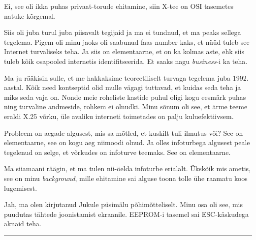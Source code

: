 Ei, see oli ikka puhas privaat-torude ehitamine, siin X-tee on OSI tasemetes 
natuke kõrgemal.


Siis oli juba turul juba piisavalt tegijaid ja ma ei tundnud, et ma peaks 
sellega tegelema. Pigem oli minu jaoks oli saabunud faas number kaks, et nüüd 
tuleb see Internet turvaliseks teha. Ja siis on elementaarne, et on ka kolmas 
aste, ehk siis tuleb kõik osapooled internetis identifitseerida. Et saaks nagu 
\emph{business}-i ka teha. 


Ma ju rääkisin sulle, et me hakkaksime teoreetiliselt turvaga tegelema juba 
1992. aastal. Kõik need kontseptid olid mulle vägagi tuttavad, et kuidas seda  
teha ja miks seda vaja on. Nonde meie roheliste kastide puhul oligi kogu 
eesmärk puhas ning turvaline andmeside, rohkem ei olnudki. Minu  sõnum oli see, 
et ärme teeme eraldi X.25 võrku, üle avaliku interneti toimetades on palju 
kuluefektiivsem.


Probleem on aegade algusest, mis sa mõtled, et kuskilt tuli ilmutus või? See on 
elementaarne, see on kogu aeg niimoodi olnud. Ja olles  infoturbega algusest 
peale tegelenud on selge, et  võrkudes on infoturve  teemaks. See on 
elementaarne. 


Ma siiamaani räägin, et ma tulen nii-öelda infoturbe erialalt. Ükskõik mis 
ametis, see on minu \emph{background}, mille ehitamine sai alguse toona tolle 
ühe raamatu koos lugemisest.


Jah, ma olen kirjutanud Jukule püsimälu põhimõtteliselt. 
Minu osa oli see, mis puudutas tähtede joonistamist ekraanile. EEPROM-i tasemel 
sai ESC-käskudega aknaid teha. 

\bigskip
\noindent\rule{.3\textwidth}{.7pt}
\bigskip

